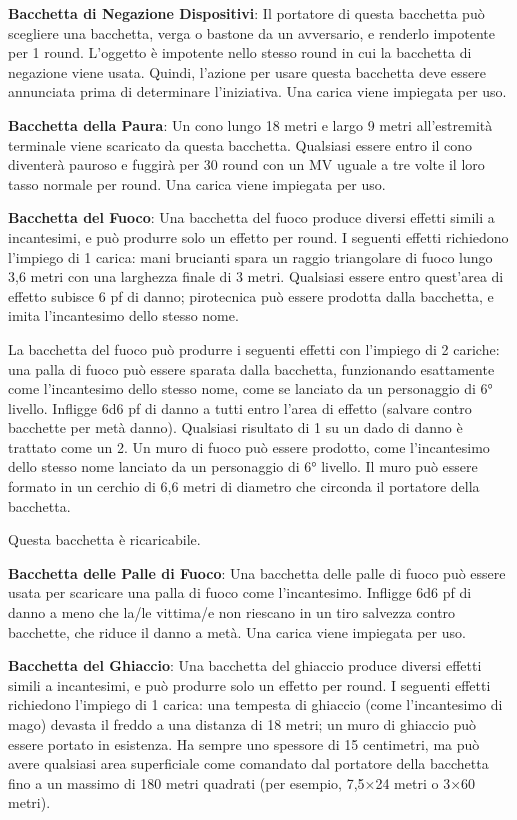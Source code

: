 \documentclass{article}
\begin{document}
\begin{multicols}{2}
\textbf{Bacchetta di Negazione Dispositivi}: Il portatore di questa bacchetta può scegliere una bacchetta, verga o bastone da un avversario, e renderlo impotente per 1 round. L'oggetto è impotente nello stesso round in cui la bacchetta di negazione viene usata. Quindi, l'azione per usare questa bacchetta deve essere annunciata prima di determinare l'iniziativa. Una carica viene impiegata per uso.

\textbf{Bacchetta della Paura}: Un cono lungo 18 metri e largo 9 metri all'estremità terminale viene scaricato da questa bacchetta. Qualsiasi essere entro il cono diventerà pauroso e fuggirà per 30 round con un MV uguale a tre volte il loro tasso normale per round. Una carica viene impiegata per uso.

\textbf{Bacchetta del Fuoco}: Una bacchetta del fuoco produce diversi effetti simili a incantesimi, e può produrre solo un effetto per round. I seguenti effetti richiedono l'impiego di 1 carica: mani brucianti spara un raggio triangolare di fuoco lungo 3,6 metri con una larghezza finale di 3 metri. Qualsiasi essere entro quest'area di effetto subisce 6 pf di danno; pirotecnica può essere prodotta dalla bacchetta, e imita l'incantesimo dello stesso nome.

La bacchetta del fuoco può produrre i seguenti effetti con l'impiego di 2 cariche: una palla di fuoco può essere sparata dalla bacchetta, funzionando esattamente come l'incantesimo dello stesso nome, come se lanciato da un personaggio di 6° livello. Infligge 6d6 pf di danno a tutti entro l'area di effetto (salvare contro bacchette per metà danno). Qualsiasi risultato di 1 su un dado di danno è trattato come un 2. Un muro di fuoco può essere prodotto, come l'incantesimo dello stesso nome lanciato da un personaggio di 6° livello. Il muro può essere formato in un cerchio di 6,6 metri di diametro che circonda il portatore della bacchetta.

Questa bacchetta è ricaricabile.

\textbf{Bacchetta delle Palle di Fuoco}: Una bacchetta delle palle di fuoco può essere usata per scaricare una palla di fuoco come l'incantesimo. Infligge 6d6 pf di danno a meno che la/le vittima/e non riescano in un tiro salvezza contro bacchette, che riduce il danno a metà. Una carica viene impiegata per uso.

\textbf{Bacchetta del Ghiaccio}: Una bacchetta del ghiaccio produce diversi effetti simili a incantesimi, e può produrre solo un effetto per round. I seguenti effetti richiedono l'impiego di 1 carica: una tempesta di ghiaccio (come l'incantesimo di mago) devasta il freddo a una distanza di 18 metri; un muro di ghiaccio può essere portato in esistenza. Ha sempre uno spessore di 15 centimetri, ma può avere qualsiasi area superficiale come comandato dal portatore della bacchetta fino a un massimo di 180 metri quadrati (per esempio, 7,5×24 metri o 3×60 metri).


\end{multicols}
\end{document}
